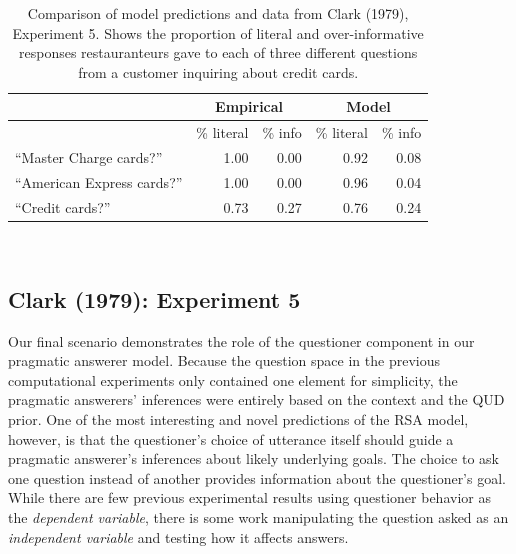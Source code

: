 \documentclass[12pt, floatsintext, jou]{apa6}
\begin{document}


\begin{table}[t!]
\centering
\begin{tabular}{ p{5cm} | r | r ||||||  r | r }
& \multicolumn{2}{c||||||}{Empirical} & \multicolumn{2}{c}{Model} \\
\hline
&           \% literal &   \%  info &           \% literal &   \%  info    \\
\hline
``Master Charge cards?'' &   1.00 & 0.00 &  0.92 & 0.08 \\
\hline
``American Express cards?''     & 1.00 & 0.00 & 0.96 & 0.04 \\
\hline
``Credit cards?''     & 0.73 & 0.27 & 0.76 & 0.24 \\
\end{tabular}
\\[1.5pt]
\caption{Comparison of model predictions and data from Clark (1979), Experiment 5. Shows the proportion of literal and over-informative responses restauranteurs gave to each of three different questions from a customer inquiring about credit cards.} 
\label{table:clark79exp5}
\end{table}

\subsection{Clark (1979): Experiment 5}
Our final scenario demonstrates the role of the questioner component in our pragmatic answerer model. Because the question space in the previous computational experiments only contained one element for simplicity, the pragmatic answerers' inferences were entirely based on the context and the QUD prior. One of the most interesting and novel predictions of the RSA model, however, is that the questioner's choice of utterance itself should guide a pragmatic answerer's inferences about likely underlying goals. The choice to ask one question instead of another provides information about the questioner's goal. While there are few previous experimental results using questioner behavior as the \emph{dependent variable}, there is some work manipulating the question asked as an \emph{independent variable} and testing how it affects answers.
\end{document}
